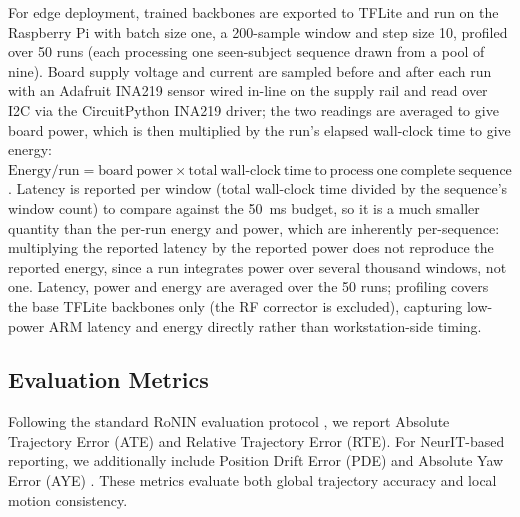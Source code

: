 \documentclass[10pt,conference,letterpaper]{IEEEtran}
\begin{document}
For edge deployment, trained backbones are exported to TFLite
\cite{tflite} and run on the Raspberry Pi with batch size one, a
200-sample window and step size 10, profiled over 50 runs (each
processing one seen-subject sequence drawn from a pool of nine).
Board supply voltage and current are sampled before and after each
run with an Adafruit INA219 sensor wired in-line on the supply rail
and read over I2C via the CircuitPython INA219 driver; the two
readings are averaged to give board power, which is then multiplied
by the run's elapsed wall-clock time to give energy: $\mathrm{Energy/run} =
\mathrm{board\ power} \times \mathrm{total\ wall\text{-}clock\ time\ to\ process\ one\ complete\ sequence}$.
Latency is reported per window (total wall-clock time divided by the
sequence's window count) to compare against the 50~ms budget, so it is a
much smaller quantity than the per-run energy and power, which are
inherently per-sequence: multiplying the reported latency by the reported
power does not reproduce the reported energy, since a run integrates
power over several thousand windows, not one. Latency, power and energy are
averaged over the 50 runs; profiling covers the base TFLite backbones
only (the RF corrector is excluded), capturing low-power ARM latency
and energy directly rather than workstation-side timing.

\subsection{Evaluation Metrics}

Following the standard RoNIN evaluation protocol \cite{ronin2019}, we
report Absolute Trajectory Error (ATE) and Relative Trajectory Error
(RTE). For NeurIT-based reporting, we additionally include Position
Drift Error (PDE) and Absolute Yaw Error (AYE) \cite{neurit2024}. These
metrics evaluate both global trajectory accuracy and local motion
consistency.
\end{document}
